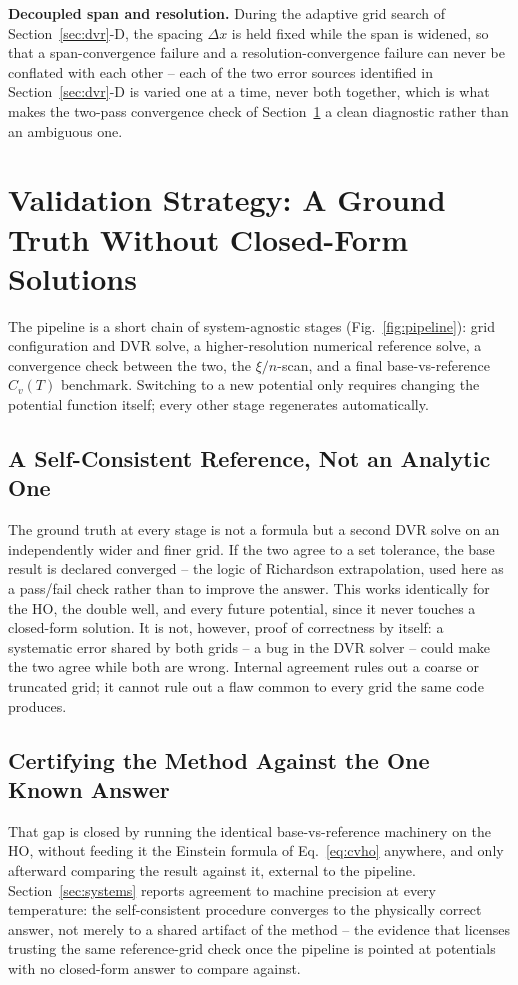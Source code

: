 \documentclass[10pt,conference]{IEEEtran}
\begin{document}
\textbf{Decoupled span and resolution.} During the adaptive grid search of Section~\ref{sec:dvr}-D, the spacing $\Delta x$ is held fixed while the span is widened, so that a span-convergence failure and a resolution-convergence failure can never be conflated with each other -- each of the two error sources identified in Section~\ref{sec:dvr}-D is varied one at a time, never both together, which is what makes the two-pass convergence check of Section~\ref{sec:validation} a clean diagnostic rather than an ambiguous one.

\section{Validation Strategy: A Ground Truth Without Closed-Form Solutions}
\label{sec:validation}
The pipeline is a short chain of system-agnostic stages (Fig.~\ref{fig:pipeline}): grid configuration and DVR solve, a higher-resolution numerical reference solve, a convergence check between the two, the $\xi/n$-scan, and a final base-vs-reference $C_v(T)$ benchmark. Switching to a new potential only requires changing the potential function itself; every other stage regenerates automatically.

\subsection{A Self-Consistent Reference, Not an Analytic One}
The ground truth at every stage is not a formula but a second DVR solve on an independently wider and finer grid. If the two agree to a set tolerance, the base result is declared converged -- the logic of Richardson extrapolation, used here as a pass/fail check rather than to improve the answer. This works identically for the HO, the double well, and every future potential, since it never touches a closed-form solution. It is not, however, proof of correctness by itself: a systematic error shared by both grids -- a bug in the DVR solver -- could make the two agree while both are wrong. Internal agreement rules out a coarse or truncated grid; it cannot rule out a flaw common to every grid the same code produces.

\subsection{Certifying the Method Against the One Known Answer}
That gap is closed by running the identical base-vs-reference machinery on the HO, without feeding it the Einstein formula of Eq.~\eqref{eq:cvho} anywhere, and only afterward comparing the result against it, external to the pipeline. Section~\ref{sec:systems} reports agreement to machine precision at every temperature: the self-consistent procedure converges to the physically correct answer, not merely to a shared artifact of the method -- the evidence that licenses trusting the same reference-grid check once the pipeline is pointed at potentials with no closed-form answer to compare against.
\end{document}
